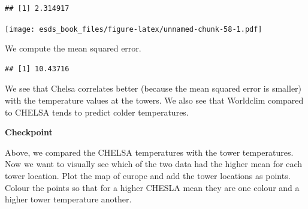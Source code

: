 \documentclass[
]{book}
\newenvironment{Shaded}{\begin{snugshade}}{\end{snugshade}}
\newcommand{\DataTypeTok}[1]{\textcolor[rgb]{0.13,0.29,0.53}{#1}}
\newcommand{\DecValTok}[1]{\textcolor[rgb]{0.00,0.00,0.81}{#1}}
\newcommand{\FloatTok}[1]{\textcolor[rgb]{0.00,0.00,0.81}{#1}}
\newcommand{\KeywordTok}[1]{\textcolor[rgb]{0.13,0.29,0.53}{\textbf{#1}}}
\newcommand{\NormalTok}[1]{#1}
\newcommand{\OperatorTok}[1]{\textcolor[rgb]{0.81,0.36,0.00}{\textbf{#1}}}
\newcommand{\OtherTok}[1]{\textcolor[rgb]{0.56,0.35,0.01}{#1}}
\newcommand{\StringTok}[1]{\textcolor[rgb]{0.31,0.60,0.02}{#1}}
\begin{document}
\begin{verbatim}
## [1] 2.314917
\end{verbatim}

\begin{Shaded}
\end{Shaded}

\texttt{[image: esds\_book\_files/figure-latex/unnamed-chunk-58-1.pdf]}

We compute the mean squared error.

\begin{Shaded}
\end{Shaded}

\begin{verbatim}
## [1] 10.43716
\end{verbatim}

We see that Chelsa correlates better (because the mean squared error is smaller) with the temperature values at the towers. We also see that Worldclim compared to CHELSA tends to predict colder temperatures.

\textbf{Checkpoint}

Above, we compared the CHELSA temperatures with the tower temperatures. Now we want to visually see which of the two data had the higher mean for each tower location.
Plot the map of europe and add the tower locations as points. Colour the points so that for a higher CHESLA mean they are one colour and a higher tower temperature another.
\end{document}
